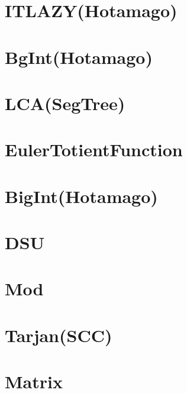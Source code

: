 \section{ITLAZY(Hotamago)}
\raggedbottom
\hrulefill

\section{BgInt(Hotamago)}
\raggedbottom
\hrulefill

\section{LCA(SegTree)}
\raggedbottom
\hrulefill

\section{EulerTotientFunction}
\raggedbottom
\hrulefill

\section{BigInt(Hotamago)}
\raggedbottom
\hrulefill

\section{DSU}
\raggedbottom
\hrulefill

\section{Mod}
\raggedbottom
\hrulefill

\section{Tarjan(SCC)}
\raggedbottom
\hrulefill

\section{Matrix}
\raggedbottom
\hrulefill
